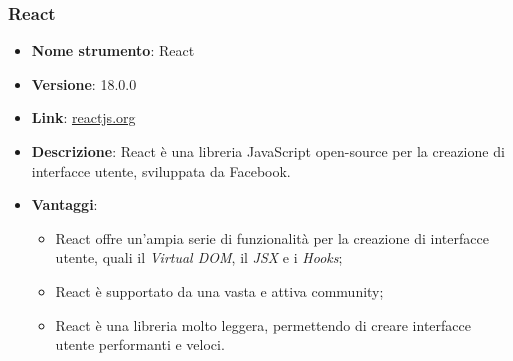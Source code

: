 \subsubsection{React}
\begin{itemize}
      \item \textbf{Nome strumento}: React
      \item \textbf{Versione}: 18.0.0
      \item \textbf{Link}: \href{https://reactjs.org/}{reactjs.org}
      \item \textbf{Descrizione}: React è una libreria JavaScript open-source per la creazione di interfacce utente, sviluppata da Facebook.
      \item \textbf{Vantaggi}:
            \begin{itemize}
                  \item React offre un'ampia serie di funzionalità per la creazione di interfacce utente, quali il \textit{Virtual DOM}, il \textit{JSX} e i \textit{Hooks};
                  \item React è supportato da una vasta e attiva community;
                  \item React è una libreria molto leggera, permettendo di creare interfacce utente performanti e veloci.
            \end{itemize}
\end{itemize}

